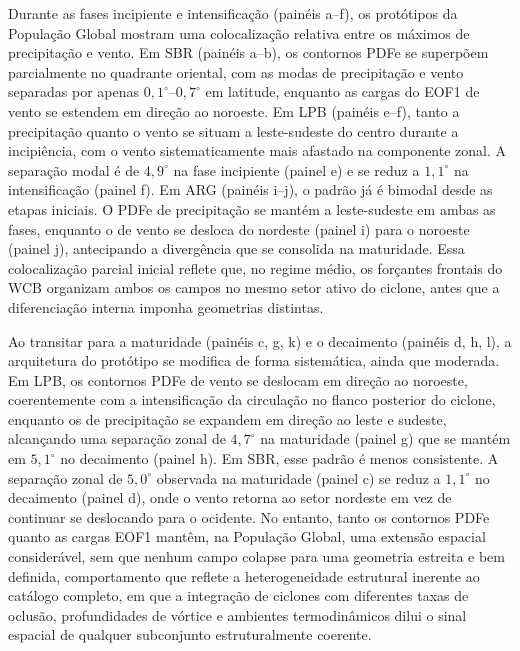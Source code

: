 Durante as fases incipiente e intensificação (painéis a--f), os protótipos da População Global mostram uma colocalização relativa entre os máximos de precipitação e vento. Em SBR (painéis a--b), os contornos PDFe se superpõem parcialmente no quadrante oriental, com as modas de precipitação e vento separadas por apenas $0{,}1^{\circ}$--$0{,}7^{\circ}$ em latitude, enquanto as cargas do EOF1 de vento se estendem em direção ao noroeste. Em LPB (painéis e--f), tanto a precipitação quanto o vento se situam a leste-sudeste do centro durante a incipiência, com o vento sistematicamente mais afastado na componente zonal. A separação modal é de $4{,}9^{\circ}$ na fase incipiente (painel e) e se reduz a $1{,}1^{\circ}$ na intensificação (painel f). Em ARG (painéis i--j), o padrão já é bimodal desde as etapas iniciais. O PDFe de precipitação se mantém a leste-sudeste em ambas as fases, enquanto o de vento se desloca do nordeste (painel i) para o noroeste (painel j), antecipando a divergência que se consolida na maturidade. Essa colocalização parcial inicial reflete que, no regime médio, os forçantes frontais do WCB organizam ambos os campos no mesmo setor ativo do ciclone, antes que a diferenciação interna imponha geometrias distintas.

Ao transitar para a maturidade (painéis c, g, k) e o decaimento (painéis d, h, l), a arquitetura do protótipo se modifica de forma sistemática, ainda que moderada. Em LPB, os contornos PDFe de vento se deslocam em direção ao noroeste, coerentemente com a intensificação da circulação no flanco posterior do ciclone, enquanto os de precipitação se expandem em direção ao leste e sudeste, alcançando uma separação zonal de $4{,}7^{\circ}$ na maturidade (painel g) que se mantém em $5{,}1^{\circ}$ no decaimento (painel h). Em SBR, esse padrão é menos consistente. A separação zonal de $5{,}0^{\circ}$ observada na maturidade (painel c) se reduz a $1{,}1^{\circ}$ no decaimento (painel d), onde o vento retorna ao setor nordeste em vez de continuar se deslocando para o ocidente. No entanto, tanto os contornos PDFe quanto as cargas EOF1 mantêm, na População Global, uma extensão espacial considerável, sem que nenhum campo colapse para uma geometria estreita e bem definida, comportamento que reflete a heterogeneidade estrutural inerente ao catálogo completo, em que a integração de ciclones com diferentes taxas de oclusão, profundidades de vórtice e ambientes termodinâmicos dilui o sinal espacial de qualquer subconjunto estruturalmente coerente.

